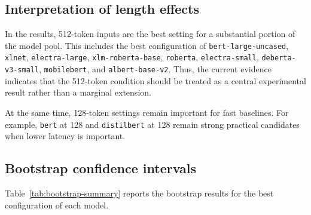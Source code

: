 \documentclass[11pt]{article}
\begin{document}
\subsection{Interpretation of length effects}

In the results, 512-token inputs are the best setting for a substantial portion of the model pool. This includes the best configuration of \texttt{bert-large-uncased}, \texttt{xlnet}, \texttt{electra-large}, \texttt{xlm-roberta-base}, \texttt{roberta}, \texttt{electra-small}, \texttt{deberta-v3-small}, \texttt{mobilebert}, and \texttt{albert-base-v2}. Thus, the current evidence indicates that the 512-token condition should be treated as a central experimental result rather than a marginal extension.

At the same time, 128-token settings remain important for fast baselines. For example, \texttt{bert} at 128 and \texttt{distilbert} at 128 remain strong practical candidates when lower latency is important.

\subsection{Bootstrap confidence intervals}

Table~\ref{tab:bootstrap-summary} reports the bootstrap results for the best configuration of each model.
\end{document}
